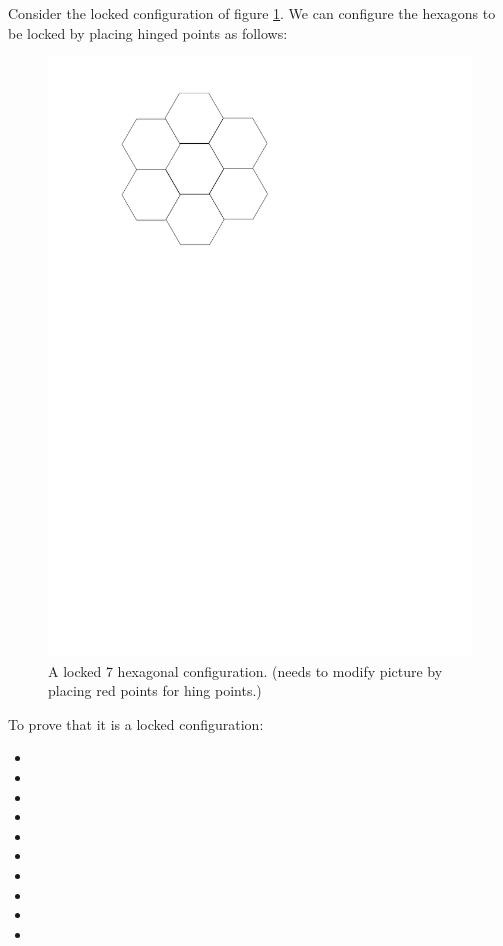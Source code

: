 Consider the locked configuration of figure \ref{figure:7hexLocked}.  We can
 configure the hexagons to be locked by placing hinged points as follows:
\begin{figure}[h]
\begin{center}
\includegraphics[scale=.33]{graphics/7hexLocked.pdf}
\caption{A locked 7 hexagonal configuration.  (needs to modify picture by
placing red points for hing points.)}
\label{figure:7hexLocked}
\end{center} 
\end{figure}
To prove that it is a locked configuration:
\begin{itemize}
 \item[\rn{1}]
 \item[\rn{2}]
 \item[\rn{3}]
 \item[\rn{4}]
 \item[\rn{5}]
 \item[\rn{6}]
 \item[\rn{7}]
 \item[\rn{8}]
 \item[\rn{9}]
 \item[\rn{10}]
 \end{itemize}
